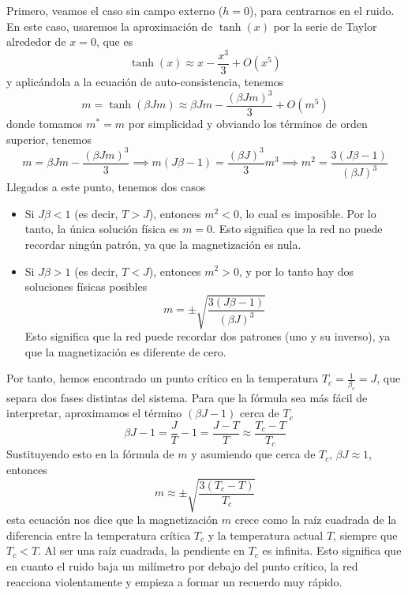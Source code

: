 \noindent
Primero, veamos el caso sin campo externo ($h=0$), para centrarnos en el ruido. En este caso, usaremos la aproximación de $\tanh(x)$ por la serie de Taylor alrededor de $x=0$, que es
\begin{equation*}
    \tanh(x) \approx x - \frac{x^3}{3} + O(x^5)
\end{equation*}
y aplicándola a la ecuación de auto-consistencia, tenemos
\begin{equation*}
    m = \tanh(\beta J m) \approx \beta Jm - \frac{(\beta Jm)^3}{3} + O(m^5)
\end{equation*}
donde tomamos $m^*=m$ por simplicidad y obviando los términos de orden superior, tenemos
\begin{equation*}
    m= \beta Jm - \frac{(\beta Jm)^3}{3} \implies m(J\beta - 1) = \frac{(\beta J)^3}{3} m^3 \implies m^2 = \frac{3(J\beta - 1)}{(\beta J)^3}
\end{equation*}
Llegados a este punto, tenemos dos casos
\begin{itemize}
    \item Si $J\beta < 1$ (es decir, $T > J$), entonces $m^2 < 0$, lo cual es imposible. Por lo tanto, la única solución física es $m = 0$. Esto significa que la red no puede recordar ningún patrón, ya que la magnetización es nula.
    \item Si $J\beta > 1$ (es decir, $T < J$), entonces $m^2 > 0$, y por lo tanto hay dos soluciones físicas posibles
    $$m = \pm\sqrt{\frac{3(J\beta - 1)}{(\beta J)^3}}$$
    Esto significa que la red puede recordar dos patrones (uno y su inverso), ya que la magnetización es diferente de cero.
\end{itemize}
Por tanto, hemos encontrado un punto crítico en la temperatura $T_c = \frac{1}{\beta_c}=J$, que separa dos fases distintas del sistema. Para que la fórmula sea más fácil de interpretar, aproximamos el término $(\beta J - 1)$ cerca de $T_c$
\begin{equation*}
    \beta J-1 = \frac{J}{T} - 1 = \frac{J - T}{T} \approx \frac{T_c - T}{T_c}
\end{equation*}
Sustituyendo esto en la fórmula de $m$ y asumiendo que cerca de $T_c$, $\beta J \approx 1$, entonces
\begin{equation*}
    m \approx \pm \sqrt{\frac{3(T_c - T)}{T_c}}
\end{equation*}
esta ecuación nos dice que la magnetización $m$ crece como la raíz cuadrada de la diferencia entre la temperatura crítica $T_c$ y la temperatura actual $T$, siempre que $T_c< T$. Al ser una raíz cuadrada, la pendiente en $T_c$ es infinita. Esto significa que en cuanto el ruido baja un milímetro por debajo del punto crítico, la red reacciona violentamente y empieza a formar un recuerdo muy rápido.  \\


